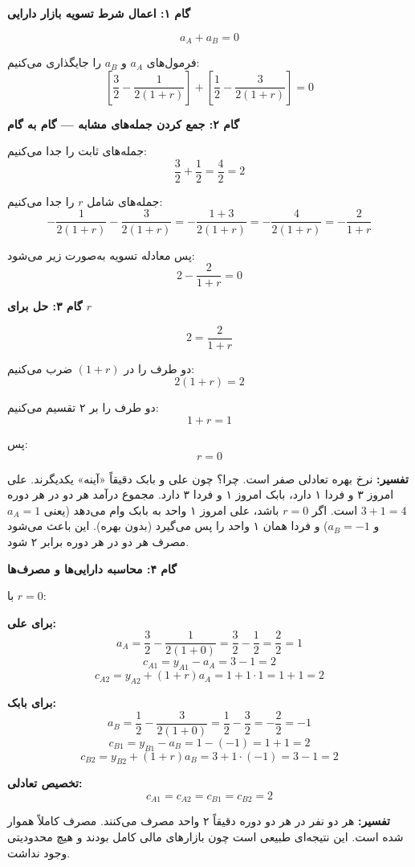 \documentclass[12pt,a4paper]{article}
\begin{document}
\textbf{گام ۱: اعمال شرط تسویه بازار دارایی}

\[
	a_A + a_B = 0
\]

فرمول‌های $a_A$ و $a_B$ را جایگذاری می‌کنیم:
\[
	\left[ \frac{3}{2} - \frac{1}{2(1+r)} \right] + \left[ \frac{1}{2} - \frac{3}{2(1+r)} \right] = 0
\]

\textbf{گام ۲: جمع کردن جمله‌های مشابه — گام به گام}

جمله‌های ثابت را جدا می‌کنیم:
\[
	\frac{3}{2} + \frac{1}{2} = \frac{4}{2} = 2
\]

جمله‌های شامل $r$ را جدا می‌کنیم:
\[
	-\frac{1}{2(1+r)} - \frac{3}{2(1+r)} = -\frac{1+3}{2(1+r)} = -\frac{4}{2(1+r)} = -\frac{2}{1+r}
\]

پس معادله تسویه به‌صورت زیر می‌شود:
\[
	2 - \frac{2}{1+r} = 0
\]

\textbf{گام ۳: حل برای $r$}

\[
	2 = \frac{2}{1+r}
\]

دو طرف را در $(1+r)$ ضرب می‌کنیم:
\[
	2(1+r) = 2
\]

دو طرف را بر ۲ تقسیم می‌کنیم:
\[
	1+r = 1
\]

پس:
\[
	\boxed{r = 0}
\]

\textbf{تفسیر:} نرخ بهره تعادلی صفر است. چرا؟ چون علی و بابک دقیقاً «آینه» یکدیگرند. علی امروز ۳ و فردا ۱ دارد، بابک امروز ۱ و فردا ۳ دارد. مجموع درآمد هر دو در هر دوره $3+1 = 4$ است. اگر $r=0$ باشد، علی امروز ۱ واحد به بابک وام می‌دهد (یعنی $a_A = 1$ و $a_B = -1$) و فردا همان ۱ واحد را پس می‌گیرد (بدون بهره). این باعث می‌شود مصرف هر دو در هر دوره برابر ۲ شود.

\textbf{گام ۴: محاسبه دارایی‌ها و مصرف‌ها}

با $r=0$:

\textbf{برای علی:}
\[
	a_A = \frac{3}{2} - \frac{1}{2(1+0)} = \frac{3}{2} - \frac{1}{2} = \frac{2}{2} = 1
\]
\[
	c_{A1} = y_{A1} - a_A = 3 - 1 = 2
\]
\[
	c_{A2} = y_{A2} + (1+r) a_A = 1 + 1 \cdot 1 = 1 + 1 = 2
\]

\textbf{برای بابک:}
\[
	a_B = \frac{1}{2} - \frac{3}{2(1+0)} = \frac{1}{2} - \frac{3}{2} = -\frac{2}{2} = -1
\]
\[
	c_{B1} = y_{B1} - a_B = 1 - (-1) = 1 + 1 = 2
\]
\[
	c_{B2} = y_{B2} + (1+r) a_B = 3 + 1 \cdot (-1) = 3 - 1 = 2
\]

\textbf{تخصیص تعادلی:}
\[
	\boxed{c_{A1} = c_{A2} = c_{B1} = c_{B2} = 2}
\]

\textbf{تفسیر:} هر دو نفر در هر دو دوره دقیقاً ۲ واحد مصرف می‌کنند. مصرف کاملاً هموار شده است. این نتیجه‌ای طبیعی است چون بازارهای مالی کامل بودند و هیچ محدودیتی وجود نداشت.
\end{document}

